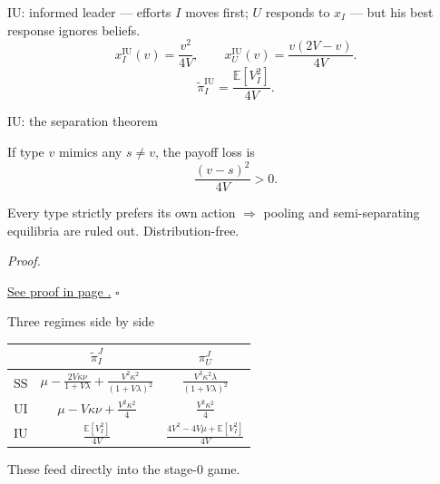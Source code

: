 \documentclass[10pt]{beamer}
\newcommand{\E}{\mathbb{E}}
\newcommand{\pt}{\widetilde{\pi}}
\newcommand{\rSS}{\mathrm{SS}}
\newcommand{\rUI}{\mathrm{UI}}
\newcommand{\rIU}{\mathrm{IU}}
\renewenvironment{proof}{%
  \par\smallskip\noindent\textit{Proof.}\hspace{0.6em}\ignorespaces
}{%
  \unskip\nobreak\hfill$\square$\par\smallskip
}
\begin{document}
\begin{frame}{$\rIU$: informed leader --- efforts}
  $I$ moves first; $U$ responds to $x_I$ --- but his best response
  ignores beliefs.
  \begin{equation}
    x_I^{\rIU}(v) = \dfrac{v^2}{4V},
    \qquad
    x_U^{\rIU}(v) = \dfrac{v(2V-v)}{4V}.
  \end{equation}
  \begin{equation*}
    \pt_I^{\rIU} = \dfrac{\E[V_I^2]}{4V}.
  \end{equation*}
\end{frame}

\begin{frame}{$\rIU$: the separation theorem}
  \begin{theorem}
    If type $v$ mimics any $s \neq v$, the payoff loss is
    \begin{equation*}
      \dfrac{(v-s)^2}{4V} > 0.
    \end{equation*}
  \end{theorem}

  Every type strictly prefers its own action $\Rightarrow$ pooling and
  semi-separating equilibria are ruled out. \alert{Distribution-free.}

  \begin{proof}
    \hyperref[prf:iu]{See proof in page \pageref{prf:iu}.}
  \end{proof}
\end{frame}

\begin{frame}{Three regimes side by side}
  \small
  \begin{table}[H]
    \centering
    \renewcommand{\arraystretch}{1.6}
    \begin{tabular}{lcc}
      \toprule
      & $\pt_I^{J}$ & $\pi_U^{J}$\\
      \midrule
      $\rSS$ & $\mu - \frac{2V\kappa\nu}{1+V\lambda}
               + \frac{V^2\kappa^2}{(1+V\lambda)^2}$
             & $\frac{V^3\kappa^2\lambda}{(1+V\lambda)^2}$\\
      $\rUI$ & $\mu - V\kappa\nu + \frac{V^2\kappa^2}{4}$
             & $\frac{V^2\kappa^2}{4}$\\
      $\rIU$ & $\frac{\E[V_I^2]}{4V}$
             & $\frac{4V^2 - 4V\mu + \E[V_I^2]}{4V}$\\
      \bottomrule
    \end{tabular}
  \end{table}

  These feed directly into the stage-0 game.
\end{frame}
\end{document}
